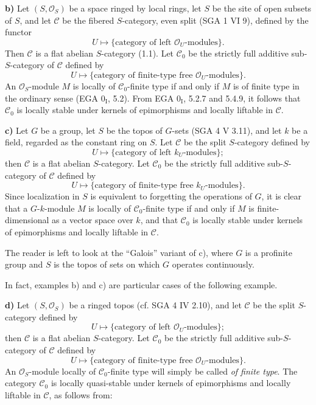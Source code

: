 \documentclass[11pt]{article}
\begin{document}
\textbf{b)} Let \((S,\mathcal O_S)\) be a space ringed by local rings, let \(S\) be the site of open subsets of \(S\), and let \(\mathcal C\) be the fibered \(S\)-category, even split (SGA 1 VI 9), defined by the functor
\[
  U\longmapsto \{\text{category of left }\mathcal O_U\text{-modules}\}.
\]
Then \(\mathcal C\) is a flat abelian \(S\)-category (1.1). Let \(\mathcal C_0\) be the strictly full additive sub-\(S\)-category of \(\mathcal C\) defined by
\[
  U\longmapsto \{\text{category of finite-type free }\mathcal O_U\text{-modules}\}.
\]
An \(\mathcal O_S\)-module \(M\) is locally of \(\mathcal C_0\)-finite type if and only if \(M\) is of finite type in the ordinary sense (EGA \(0_{\mathrm I}\), 5.2). From EGA \(0_{\mathrm I}\), 5.2.7 and 5.4.9, it follows that \(\mathcal C_0\) is locally stable under kernels of epimorphisms and locally liftable in \(\mathcal C\).

\textbf{c)} Let \(G\) be a group, let \(S\) be the topos of \(G\)-sets (SGA 4 V 3.11), and let \(k\) be a field, regarded as the constant ring on \(S\). Let \(\mathcal C\) be the split \(S\)-category defined by
\[
  U\longmapsto \{\text{category of left }k_U\text{-modules}\};
\]
then \(\mathcal C\) is a flat abelian \(S\)-category. Let \(\mathcal C_0\) be the strictly full additive sub-\(S\)-category of \(\mathcal C\) defined by
\[
  U\longmapsto \{\text{category of finite-type free }k_U\text{-modules}\}.
\]
Since localization in \(S\) is equivalent to forgetting the operations of \(G\), it is clear that a \(G\)-\(k\)-module \(M\) is locally of \(\mathcal C_0\)-finite type if and only if \(M\) is finite-dimensional as a vector space over \(k\), and that \(\mathcal C_0\) is locally stable under kernels of epimorphisms and locally liftable in \(\mathcal C\).

The reader is left to look at the ``Galois'' variant of c), where \(G\) is a profinite group and \(S\) is the topos of sets on which \(G\) operates continuously.

In fact, examples b) and c) are particular cases of the following example.

\textbf{d)} Let \((S,\mathcal O_S)\) be a ringed topos (cf. SGA 4 IV 2.10), and let \(\mathcal C\) be the split \(S\)-category defined by
\[
  U\longmapsto \{\text{category of left }\mathcal O_U\text{-modules}\};
\]
then \(\mathcal C\) is a flat abelian \(S\)-category. Let \(\mathcal C_0\) be the strictly full additive sub-\(S\)-category of \(\mathcal C\) defined by
\[
  U\longmapsto \{\text{category of finite-type free }\mathcal O_U\text{-modules}\}.
\]
An \(\mathcal O_S\)-module locally of \(\mathcal C_0\)-finite type will simply be called \emph{of finite type}. The category \(\mathcal C_0\) is locally quasi-stable under kernels of epimorphisms and locally liftable in \(\mathcal C\), as follows from:
\end{document}
